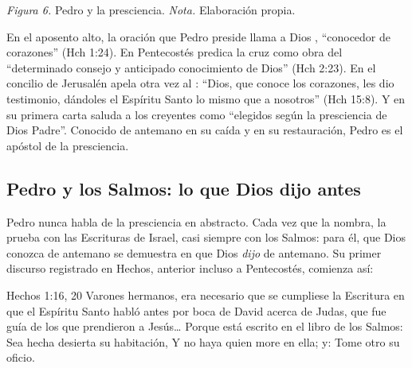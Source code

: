 \begin{center}
\par
{\footnotesize\color{gris}\textit{Figura 6.} Pedro y la presciencia. \textit{Nota.} Elaboración propia.}
\end{center}

En el aposento alto, la oración que Pedro preside llama a Dios , ``conocedor de corazones'' (Hch 1:24). En Pentecostés predica la cruz como obra del ``determinado consejo y anticipado conocimiento de Dios'' (Hch 2:23). En el concilio de Jerusalén apela otra vez al : ``Dios, que conoce los corazones, les dio testimonio, dándoles el Espíritu Santo lo mismo que a nosotros'' (Hch 15:8). Y en su primera carta saluda a los creyentes como ``elegidos según la presciencia de Dios Padre''. Conocido de antemano en su caída y en su restauración, Pedro es el apóstol de la presciencia.


\subsection{Pedro y los Salmos: lo que Dios dijo antes}
Pedro nunca habla de la presciencia en abstracto. Cada vez que la nombra, la prueba con las Escrituras de Israel, casi siempre con los Salmos: para él, que Dios conozca de antemano se demuestra en que Dios \emph{dijo} de antemano. Su primer discurso registrado en Hechos, anterior incluso a Pentecostés, comienza así:

\begin{verso}{Hechos 1:16, 20}
Varones hermanos, era necesario que se cumpliese la Escritura en que el Espíritu Santo habló antes por boca de David acerca de Judas, que fue guía de los que prendieron a Jesús\ldots{} Porque está escrito en el libro de los Salmos: Sea hecha desierta su habitación, Y no haya quien more en ella; y: Tome otro su oficio.
\end{verso}

